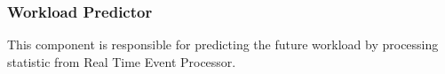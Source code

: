 \subsubsection{Workload Predictor}
This component is responsible for predicting the future workload by processing statistic from Real Time Event Processor.